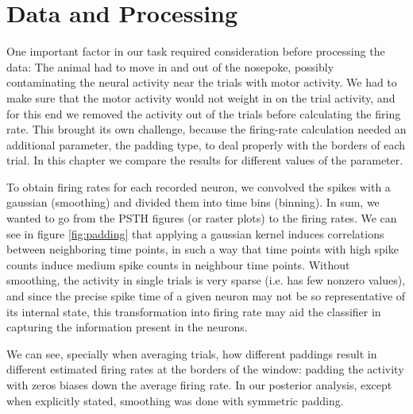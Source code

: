 \chapter{Data and Processing}
\label{chap:data_processing}

One important factor in our task required consideration before processing the data: The animal had to move in and out of the nosepoke, possibly contaminating the neural activity near the trials with motor activity. We had to make sure that the motor activity would not weight in on the trial activity, and for this end we removed the activity out of the trials before calculating the firing rate. This brought its own challenge, because the firing-rate calculation needed an additional parameter, the padding type, to deal properly with the borders of each trial. In this chapter we compare the results for different values of the parameter.

To obtain firing rates for each recorded neuron, we convolved the spikes with a gaussian (smoothing) and divided them into time bins (binning). In sum, we wanted to go from the PSTH figures (or raster plots) to the firing rates. We can see in figure \ref{fig:padding} that applying a gaussian kernel induces correlations between neighboring time points, in such a way that time points with high spike counts induce medium spike counts in neighbour time points. Without smoothing, the activity in single trials is very sparse (i.e. has few nonzero values), and since the precise spike time of a given neuron may not be so representative of its internal state, this transformation into firing rate may aid the classifier in capturing the information present in the neurons.
    
We can see, specially when averaging trials, how different paddings result in different estimated firing rates at the borders of the window: padding the activity with zeros biases down the average firing rate. In our posterior analysis, except when explicitly stated, smoothing was done with symmetric padding.

